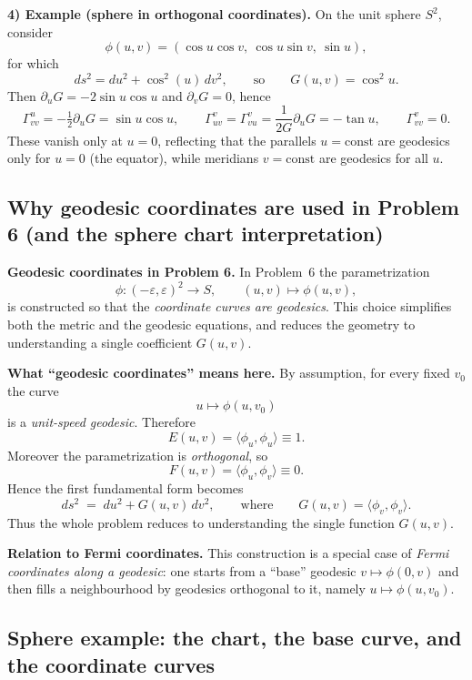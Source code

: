 \documentclass[12pt,a4paper]{article}
\theoremstyle{plain}
\theoremstyle{definition}      %
\begin{document}
	\medskip
	\textbf{4) Example (sphere in orthogonal coordinates).}
	On the unit sphere $S^2$, consider
	\[
	\phi(u,v)=(\cos u\cos v,\ \cos u\sin v,\ \sin u),
	\]
	for which
	\[
	ds^2 = du^2 + \cos^2(u)\,dv^2,
	\qquad\text{so}\qquad
	G(u,v)=\cos^2 u.
	\]
	Then $\partial_u G=-2\sin u\cos u$ and $\partial_v G=0$, hence
	\[
	\Gamma^{u}_{vv}=-\tfrac12\partial_u G=\sin u\cos u,\qquad
	\Gamma^{v}_{uv}=\Gamma^{v}_{vu}=\frac{1}{2G}\partial_u G=-\tan u,\qquad
	\Gamma^{v}_{vv}=0.
	\]
	These vanish only at $u=0$, reflecting that the parallels $u=\text{const}$ are geodesics only for $u=0$
	(the equator), while meridians $v=\text{const}$ are geodesics for all $u$.
	
	\subsection*{Why geodesic coordinates are used in Problem 6 (and the sphere chart interpretation)}
	
	\textbf{Geodesic coordinates in Problem 6.}
	In Problem~6 the parametrization
	\[
	\phi:(-\varepsilon,\varepsilon)^2 \to S,\qquad (u,v)\mapsto \phi(u,v),
	\]
	is constructed so that the \emph{coordinate curves are geodesics}. This choice simplifies both the metric and the
	geodesic equations, and reduces the geometry to understanding a single coefficient $G(u,v)$.
	
	\medskip
	\textbf{What ``geodesic coordinates'' means here.}
	By assumption, for every fixed $v_0$ the curve
	\[
	u\longmapsto \phi(u,v_0)
	\]
	is a \emph{unit-speed geodesic}. Therefore
	\[
	E(u,v)=\langle \phi_u,\phi_u\rangle \equiv 1.
	\]
	Moreover the parametrization is \emph{orthogonal}, so
	\[
	F(u,v)=\langle \phi_u,\phi_v\rangle \equiv 0.
	\]
	Hence the first fundamental form becomes
	\[
	ds^2 \;=\; du^2 + G(u,v)\,dv^2,
	\qquad\text{where}\qquad
	G(u,v)=\langle \phi_v,\phi_v\rangle.
	\]
	Thus the whole problem reduces to understanding the single function $G(u,v)$.
	
	\medskip
	\textbf{Relation to Fermi coordinates.}
	This construction is a special case of \emph{Fermi coordinates along a geodesic}: one starts from a ``base''
	geodesic $v\mapsto \phi(0,v)$ and then fills a neighbourhood by geodesics orthogonal to it, namely
	$u\mapsto \phi(u,v_0)$.
	
	\subsection*{Sphere example: the chart, the base curve, and the coordinate curves}
	
\end{document}
